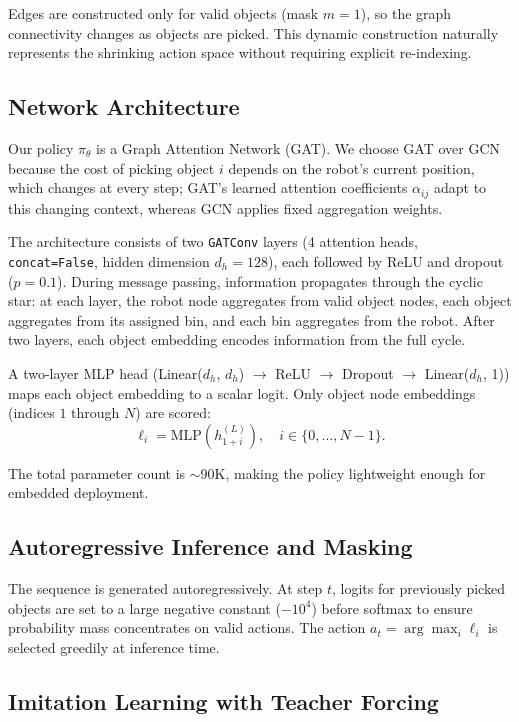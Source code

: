 \documentclass[conference]{IEEEtran}
\begin{document}
Edges are constructed only for valid objects (mask $m{=}1$), so the graph connectivity changes as objects are picked. This dynamic construction naturally represents the shrinking action space without requiring explicit re-indexing.

\subsection{Network Architecture}

Our policy $\pi_\theta$ is a Graph Attention Network (GAT). We choose GAT over GCN because the cost of picking object $i$ depends on the robot's current position, which changes at every step; GAT's learned attention coefficients $\alpha_{ij}$ adapt to this changing context, whereas GCN applies fixed aggregation weights.

The architecture consists of two \texttt{GATConv} layers (4 attention heads, \texttt{concat=False}, hidden dimension $d_h{=}128$), each followed by ReLU and dropout ($p{=}0.1$). During message passing, information propagates through the cyclic star: at each layer, the robot node aggregates from valid object nodes, each object aggregates from its assigned bin, and each bin aggregates from the robot. After two layers, each object embedding encodes information from the full cycle.

A two-layer MLP head (Linear($d_h$, $d_h$) $\to$ ReLU $\to$ Dropout $\to$ Linear($d_h$, 1)) maps each object embedding to a scalar logit. Only object node embeddings (indices $1$ through $N$) are scored:
\begin{equation}
\ell_i = \text{MLP}(h^{(L)}_{1+i}), \quad i \in \{0,\dots,N{-}1\}.
\end{equation}

The total parameter count is ${\sim}$90K, making the policy lightweight enough for embedded deployment.

\subsection{Autoregressive Inference and Masking}

The sequence is generated autoregressively. At step $t$, logits for previously picked objects are set to a large negative constant ($-10^4$) before softmax to ensure probability mass concentrates on valid actions. The action $a_t = \arg\max_i \ell_i$ is selected greedily at inference time.

\subsection{Imitation Learning with Teacher Forcing}
\end{document}
